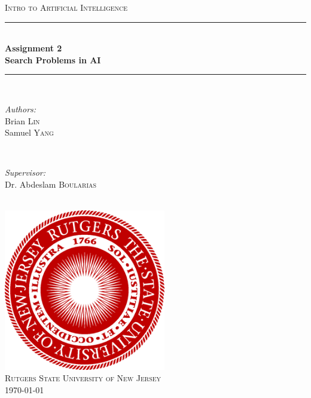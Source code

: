 \documentclass[12pt]{article}
\begin{document}
	
	\begin{titlepage}
		\newcommand{\HRule}{\noindent\rule{6.5in}{1pt}} %
		
		\centering
		
		\textsc{\Large Intro to Artificial Intelligence}\\[.75cm]
		
		\noindent\rule{6.5in}{1.5pt}\\[.75cm]
		{ \huge \bfseries Assignment 2}\\[.4cm]
		{ \large \bfseries Search Problems in AI}\\[.2cm]
		\noindent\rule{6.5in}{1.5pt}\\[1cm]
		
		
		\begin{minipage}{0.4\textwidth}
			\begin{flushleft} \large
				\emph{Authors:}\\
				Brian \textsc{Lin} \\
				Samuel \textsc{Yang}
			\end{flushleft}
		\end{minipage}
		~
		\begin{minipage}{0.4\textwidth}
			\begin{flushright} \large
				\emph{Supervisor:} \\
				Dr. Abdeslam  \textsc{Boularias} %
			\end{flushright}
		\end{minipage}\\[2cm]

		\includegraphics[width=200pt,height=200pt]{RutgersLogo.png}\\[1.5cm]
		\textsc{\Large Rutgers State University of New Jersey}\\[1cm]
		{\large \today}\\[2cm]
		
		\vfill %
		
	\end{titlepage}
	
	
\end{document}
